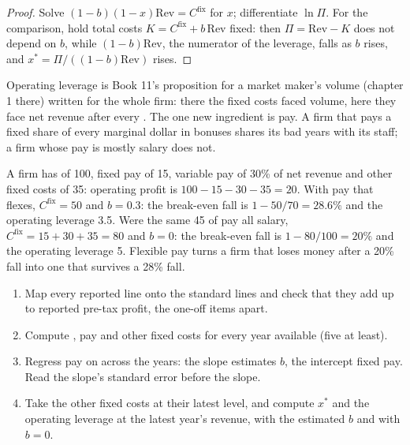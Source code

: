 \begin{proof}
Solve $(1-b)(1-x)\mathrm{Rev}=C^{\mathrm{fix}}$ for $x$; differentiate $\ln\Pi$. For the comparison, hold total costs
$K=C^{\mathrm{fix}}+b\,\mathrm{Rev}$ fixed: then $\Pi=\mathrm{Rev}-K$ does not depend on $b$, while $(1-b)\mathrm{Rev}$, the numerator of the
leverage, falls as $b$ rises, and $x^\ast=\Pi/((1-b)\mathrm{Rev})$ rises.
\end{proof}

Operating leverage is Book 11's proposition for a market maker's volume (chapter 1 there) written for the whole firm: there the fixed costs faced
volume, here they face net revenue after every . The one new ingredient is pay. A firm that pays a fixed share of every marginal
dollar in bonuses shares its bad years with its staff; a firm whose pay is mostly salary does not.

\begin{example}[A firm of 100]\label{ex:fm:the-economics-of-a-trading-firm:small}
A firm has  of 100, fixed pay of 15, variable pay of 30\% of net revenue and other fixed costs of 35: operating profit is
$100-15-30-35=20$. With pay that flexes, $C^{\mathrm{fix}}=50$ and $b=0.3$: the break-even fall is $1-50/70=28.6\%$ and the operating leverage 3.5.
Were the same 45 of pay all salary, $C^{\mathrm{fix}}=15+30+35=80$ and $b=0$: the break-even fall is $1-80/100=20\%$ and the
operating leverage 5. Flexible pay turns a firm that
loses money after a 20\% fall into one that survives a 28\% fall.
\end{example}

\begin{method}\label{met:fm:the-economics-of-a-trading-firm:read}
\begin{enumerate}
\item Map every reported line onto the standard lines and check that they add up to reported pre-tax profit, the one-off items apart.
\item Compute , pay and other fixed costs for every year available (five at least).
\item Regress pay on  across the years: the slope estimates $b$, the intercept fixed pay. Read the slope's standard error before
the slope.
\item Take the other fixed costs at their latest level, and compute $x^\ast$ and the operating leverage at the latest year's revenue, with the
estimated $b$ and with $b=0$.
\end{enumerate}
\end{method}

